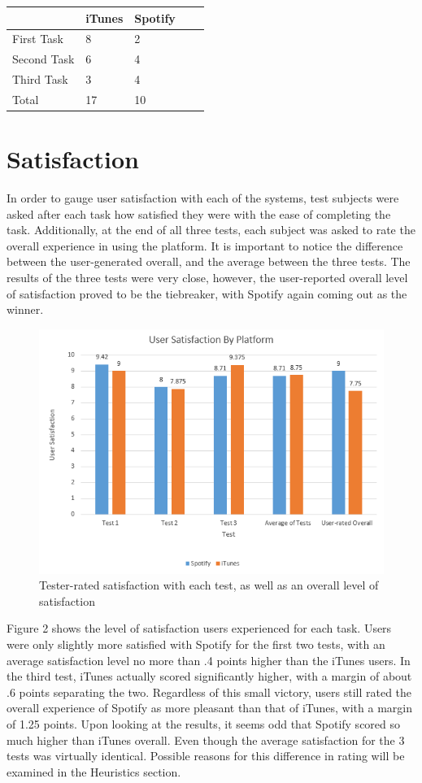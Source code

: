 \documentclass[12pt]{report}
\begin{document}
\begin{table}[h]
\centering
\begin{tabular}{lllll}
\hline
            & iTunes & Spotify &  &  \\ \hline
First Task  & 8      & 2       &  &  \\
Second Task & 6      & 4       &  &  \\
Third Task  & 3      & 4       &  &  \\ \hline
Total       & 17     & 10      &  & 
\end{tabular}
\end{table}

\section{Satisfaction}

In order to gauge user satisfaction with each of the systems, test subjects were asked after each task how satisfied they were with the ease of completing the task. Additionally, at the end of all three tests, each subject was asked to rate the overall experience in using the platform. It is important to notice the difference between the user-generated overall, and the average between the three tests. The results of the three tests were very close, however, the user-reported overall level of satisfaction proved to be the tiebreaker, with Spotify again coming out as the winner.


\begin{figure}[H]
	\centering
	\includegraphics[width=.75\textwidth]{chart2.png}
	\caption{Tester-rated satisfaction with each test, as well as an overall level of satisfaction}
\end{figure}

Figure 2 shows the level of satisfaction users experienced for each task. Users were only slightly more satisfied with Spotify for the first two tests, with an average satisfaction level no more than .4 points higher than the iTunes users. In the third test, iTunes actually scored significantly higher, with a margin of about .6 points separating the two. Regardless of this small victory, users still rated the overall experience of Spotify as more pleasant than that of iTunes, with a margin of 1.25 points. Upon looking at the results, it seems odd that Spotify scored so much higher than iTunes overall. Even though the average satisfaction for the 3 tests was virtually identical. Possible reasons for this difference in rating will be examined in the Heuristics section.
\end{document}
